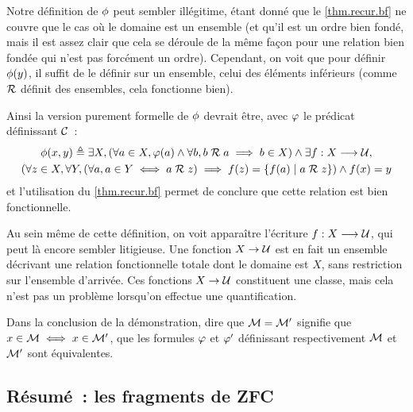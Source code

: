 \begin{remark}
  Notre définition de $\phi$ peut sembler illégitime, étant donné que le
  \cref{thm.recur.bf} ne couvre que le cas où le domaine est un ensemble (et
  qu'il est un ordre bien fondé, mais il est assez clair que cela se déroule de
  la même façon pour une relation bien fondée qui n'est pas forcément un ordre).
  Cependant, on voit que pour définir $\phi(y)$, il suffit de le définir sur
  un ensemble, celui des éléments inférieurs (comme $\mathrel{\mathcal{R}}$ définit des
  ensembles, cela fonctionne bien).

  Ainsi la version purement formelle de $\phi$ devrait être, avec $\varphi$ le
  prédicat définissant $\mathcal{C}$~:
  \begin{multline*}
    \phi(x,y) \triangleq \exists X,
    (\forall a \in X, \varphi(a) \land \forall b, b\mathrel{\mathcal{R}} a \implies b \in X)
    \land \exists f : \displaystyle X \longrightarrow \mathcal{U}, \\(\forall z\in X,
    \forall Y, (\forall a, a \in Y \iff a \mathrel{\mathcal{R}} z) \implies
    f(z) = \left\{ f(a) \;\middle\vert\; a \mathrel{\mathcal{R}} z \right\})\land f(x) = y
  \end{multline*}
  et l'utilisation du \cref{thm.recur.bf} permet de conclure que cette relation
  est bien fonctionnelle.

  Au sein même de cette définition, on voit apparaître l'écriture
  $f : \displaystyle X \longrightarrow \mathcal{U}$, qui peut là encore sembler litigieuse. Une
  fonction $X \to \mathcal{U}$ est en fait un ensemble décrivant une relation
  fonctionnelle totale dont le domaine est $X$, sans restriction sur l'ensemble
  d'arrivée. Ces fonctions $X \to \mathcal{U}$ constituent une classe, mais
  cela n'est pas un problème lorsqu'on effectue une quantification.
\end{remark}

\begin{remark}
  Dans la conclusion de la démonstration, dire que $\mathcal{M} = \mathcal{M}'$
  signifie que $x \in \mathcal{M} \iff x \in \mathcal{M}'$,  que
  les formules $\varphi$ et $\varphi'$ définissant respectivement $\mathcal{M}$
  et $\mathcal{M}'$ sont équivalentes.
\end{remark}

\subsection{Résumé~: les fragments de ZFC}\label{subsec.frag.ZFC}

